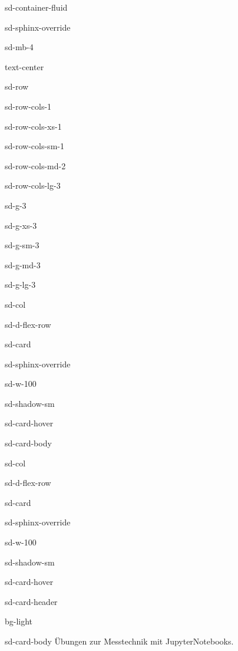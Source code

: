 \documentclass[letterpaper,10pt,english]{jupyterBook}
\begin{document}
\begin{sphinxuseclass}{sd-container-fluid}
\begin{sphinxuseclass}{sd-sphinx-override}
\begin{sphinxuseclass}{sd-mb-4}
\begin{sphinxuseclass}{text-center}
\begin{sphinxuseclass}{sd-row}
\begin{sphinxuseclass}{sd-row-cols-1}
\begin{sphinxuseclass}{sd-row-cols-xs-1}
\begin{sphinxuseclass}{sd-row-cols-sm-1}
\begin{sphinxuseclass}{sd-row-cols-md-2}
\begin{sphinxuseclass}{sd-row-cols-lg-3}
\begin{sphinxuseclass}{sd-g-3}
\begin{sphinxuseclass}{sd-g-xs-3}
\begin{sphinxuseclass}{sd-g-sm-3}
\begin{sphinxuseclass}{sd-g-md-3}
\begin{sphinxuseclass}{sd-g-lg-3}
\begin{sphinxuseclass}{sd-col}
\begin{sphinxuseclass}{sd-d-flex-row}
\begin{sphinxuseclass}{sd-card}
\begin{sphinxuseclass}{sd-sphinx-override}
\begin{sphinxuseclass}{sd-w-100}
\begin{sphinxuseclass}{sd-shadow-sm}
\begin{sphinxuseclass}{sd-card-hover}
\begin{sphinxuseclass}{sd-card-body}
\end{sphinxuseclass}{\hyperref[\detokenize{content/00_jupyter::doc}]{}}
\end{sphinxuseclass}
\end{sphinxuseclass}
\end{sphinxuseclass}
\end{sphinxuseclass}
\end{sphinxuseclass}
\end{sphinxuseclass}
\end{sphinxuseclass}
\begin{sphinxuseclass}{sd-col}
\begin{sphinxuseclass}{sd-d-flex-row}
\begin{sphinxuseclass}{sd-card}
\begin{sphinxuseclass}{sd-sphinx-override}
\begin{sphinxuseclass}{sd-w-100}
\begin{sphinxuseclass}{sd-shadow-sm}
\begin{sphinxuseclass}{sd-card-hover}
\begin{sphinxuseclass}{sd-card-header}
\begin{sphinxuseclass}{bg-light}
\sphinxAtStartPar
{} 🧑🏽‍💻

\end{sphinxuseclass}
\end{sphinxuseclass}
\begin{sphinxuseclass}{sd-card-body}
\sphinxAtStartPar
Übungen zur Messtechnik mit Jupyter\sphinxhyphen{}Notebooks.


\end{sphinxuseclass}
\end{sphinxuseclass}
\end{sphinxuseclass}
\end{sphinxuseclass}
\end{sphinxuseclass}
\end{sphinxuseclass}
\end{sphinxuseclass}
\end{sphinxuseclass}
\end{sphinxuseclass}
\end{sphinxuseclass}
\end{sphinxuseclass}
\end{sphinxuseclass}
\end{sphinxuseclass}
\end{sphinxuseclass}
\end{sphinxuseclass}
\end{sphinxuseclass}
\end{sphinxuseclass}
\end{sphinxuseclass}
\end{sphinxuseclass}
\end{sphinxuseclass}
\end{sphinxuseclass}
\end{sphinxuseclass}
\end{sphinxuseclass}
\end{document}

